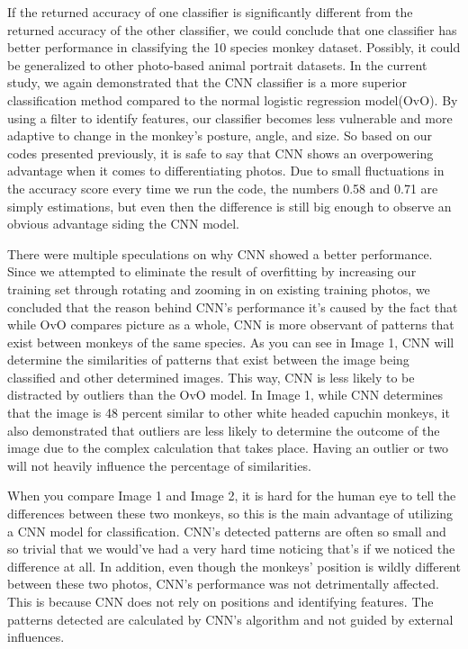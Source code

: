 \documentclass[12pt, letterpaper]{article}
\begin{document}
        \quad\quad If the returned accuracy of one classifier is significantly different from the returned accuracy of the other classifier, we could conclude that one classifier has better performance in classifying the 10 species monkey dataset. Possibly, it could be generalized to other photo-based animal portrait datasets. In the current study, we again demonstrated that the CNN classifier is a more superior classification method compared to the normal logistic regression model(OvO). By using a filter to identify features, our classifier becomes less vulnerable and more adaptive to change in the monkey’s posture, angle, and size. So based on our codes presented previously, it is safe to say that CNN shows an overpowering advantage when it comes to differentiating photos. Due to small fluctuations in the accuracy score every time we run the code, the numbers 0.58 and 0.71 are simply estimations, but even then the difference is still big enough to observe an obvious advantage siding the CNN model. 
        
        There were multiple speculations on why CNN showed a better performance. Since we attempted to eliminate the result of overfitting by increasing our training set through rotating and zooming in on existing training photos, we concluded that the reason behind CNN’s performance it’s caused by the fact that while OvO compares picture as a whole, CNN is more observant of patterns that exist between monkeys of the same species. As you can see in Image 1, CNN will determine the similarities of patterns that exist between the image being classified and other determined images. This way, CNN is less likely to be distracted by outliers than the OvO model. In Image 1, while CNN determines that the image is 48 percent similar to other white headed capuchin monkeys, it also demonstrated that outliers are less likely to determine the outcome of the image due to the complex calculation that takes place. Having an outlier or two will not heavily influence the percentage of similarities. 
        
        When you compare Image 1 and Image 2, it is hard for the human eye to tell the differences between these two monkeys, so this is the main advantage of utilizing a CNN model for classification. CNN’s detected patterns are often so small and so trivial that we would’ve had a very hard time noticing that’s if we noticed the difference at all. In addition, even though the monkeys' position is wildly different between these two photos, CNN’s performance was not detrimentally affected. This is because CNN does not rely on positions and identifying features. The patterns detected are calculated by CNN’s algorithm and not guided by external influences. 
        
\end{document}
